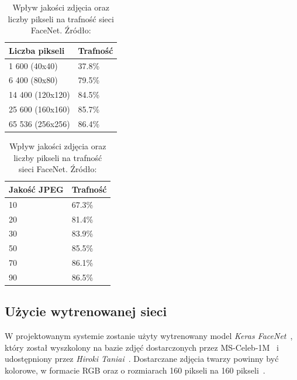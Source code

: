 \begin{table}[]
    \caption{Wpływ jakości zdjęcia oraz liczby pikseli na trafność sieci FaceNet. Źródło: \cite{schroff2015facenet}}
    \label{tab:quality_pixels_to_rate}
    \begin{minipage}{.5\linewidth}
        \centering
        \begin{tabular}{|l|l|}
            \hline
            Liczba pikseli                & Trafność \\ \hline
            1 600 \hspace{15px} (40x40)   & 37.8\%   \\ \hline
            6 400 \hspace{15px}     (80x80)    & 79.5\%   \\ \hline
            14 400 \hspace{10px}  (120x120) & 84.5\%   \\ \hline
            25 600 \hspace{10px}  (160x160) & 85.7\%   \\ \hline
            65 536 \hspace{10px}  (256x256) & 86.4\%   \\ \hline
        \end{tabular}
    \end{minipage}%
    \begin{minipage}{.5\linewidth}
        \centering
        \begin{tabular}{|l|l|}
            \hline
            Jakość JPEG & Trafność \\ \hline
            10          & 67.3\%   \\ \hline
            20          & 81.4\%   \\ \hline
            30          & 83.9\%   \\ \hline
            50          & 85.5\%   \\ \hline
            70          & 86.1\%   \\ \hline
            90          & 86.5\%   \\ \hline
        \end{tabular}
    \end{minipage}
\end{table}

\subsection{Użycie wytrenowanej sieci}

W projektowanym systemie zostanie użyty wytrenowany model \textit{Keras FaceNet}~\cite{taniai-2018},
który został wyszkolony na bazie zdjęć dostarczonych przez MS-Celeb-1M~\cite{microsoft-2020-celeb1m}
i udostępniony przez \textit{Hiroki Taniai}~\cite{taniai-no-date}.
Dostarczane zdjęcia twarzy powinny być kolorowe, w formacie RGB oraz
o rozmiarach 160 pikseli na 160 pikseli~\cite{brownlee-2019}.


